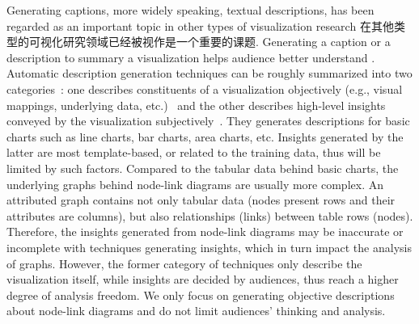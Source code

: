 Generating captions, more widely speaking, textual descriptions, has been regarded as an important topic in other types of visualization research {在其他类型的可视化研究领域已经被视作是一个重要的课题}.
Generating a caption or a description to summary a visualization helps audience better understand .
Automatic description generation techniques can be roughly summarized into two categories~\cite{DBLP:conf/inlg/ObeidH20}: one describes constituents of a visualization objectively (e.g., visual mappings, underlying data, etc.)~\cite{DBLP:journals/coling/MittalMCR98, DBLP:journals/tochi/FerresLST13} and the other describes high-level insights conveyed by the visualization subjectively~\cite{DBLP:conf/apvis/LiuXHWY20, DBLP:conf/inlg/ObeidH20}.
They generates descriptions for basic charts such as line charts, bar charts, area charts, etc.
Insights generated by the latter are most template-based, or related to the training data, thus will be limited by such factors.
Compared to the tabular data behind basic charts, the underlying graphs behind node-link diagrams are usually more complex.
An attributed graph contains not only tabular data (nodes present rows and their attributes are columns), but also relationships (links) between table rows (nodes).
Therefore, the insights generated from node-link diagrams may be inaccurate or incomplete with techniques generating insights, which in turn impact the analysis of graphs.
However, the former category of techniques only describe the visualization itself, while insights are decided by audiences, thus reach a higher degree of analysis freedom.
We only focus on generating objective descriptions about node-link diagrams and do not limit audiences' thinking and analysis.



